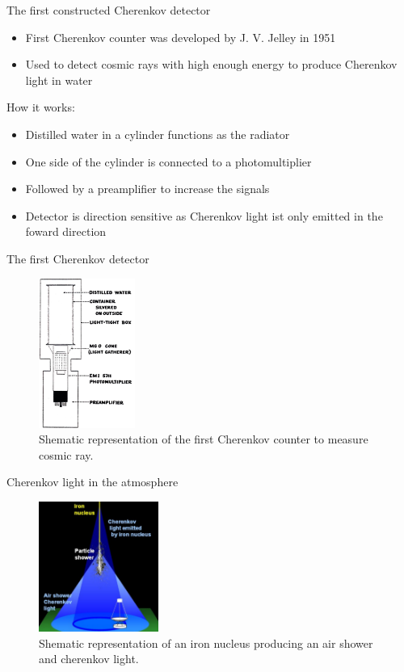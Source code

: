 \documentclass[aspectratio=1610, 10pt]{beamer}
\begin{document}
\begin{frame}{The first constructed Cherenkov detector}
  \begin{itemize}
    \item First Cherenkov counter was developed by J. V. Jelley in 1951
    \medskip
    \item Used to detect cosmic rays with high enough energy to produce Cherenkov light in water
    \medskip \\
  \end{itemize}
\vspace{0.5cm}
How it works:
  \begin{itemize}
    \item Distilled water in a cylinder functions as the radiator
    \medskip
    \item One side of the cylinder is connected to a photomultiplier
    \medskip
    \item Followed by a preamplifier to increase the signals
    \medskip
    \item Detector is direction sensitive as Cherenkov light ist only emitted in the foward direction
  \end{itemize}
\end{frame}

\begin{frame}{The first Cherenkov detector}
  \begin{figure}
    \includegraphics[width=0.28\textwidth]{images/the_first.png}
    \caption{Shematic representation of the first Cherenkov counter to measure cosmic ray.}
  \end{figure}
\end{frame}

\begin{frame}{Cherenkov light in the atmosphere}
  \begin{figure}
    \includegraphics[width=0.35\textwidth]{images/cherenkov_cone.png}
    \caption{Shematic representation of an iron nucleus producing an air shower and cherenkov light.}
  \end{figure}
\end{frame}
\end{document}

